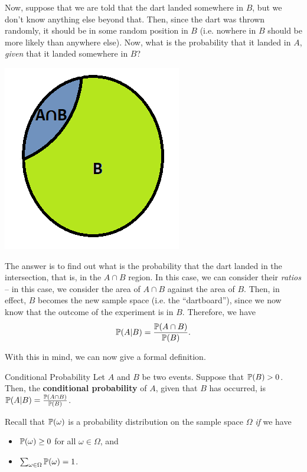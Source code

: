 \documentclass[letterpaper]{article}
\begin{document}
\begin{mdframed}[]
    Now, suppose that we are told that the dart landed somewhere in $B$, but we don't know anything else beyond that. Then, since the dart was thrown randomly, it should be in some random position in $B$ (i.e. nowhere in $B$ should be more likely than anywhere else). Now, what is the probability that it landed in $A$, \emph{given} that it landed somewhere in $B$?
    \begin{center}
        \includegraphics[scale=0.7]{../assets/venn2.png}
    \end{center}
    The answer is to find out what is the probability that the dart landed in the intersection, that is, in the $A \cap B$ region. In this case, we can consider their \emph{ratios} -- in this case, we consider the area of $A \cap B$ against the area of $B$. Then, in effect, $B$ becomes the new sample space (i.e. the ``dartboard''), since we now know that the outcome of the experiment is in $B$. Therefore, we have 
    \[\mathbb{P}(A | B) = \frac{\mathbb{P}(A \cap B)}{\mathbb{P}(B)}.\]
\end{mdframed}
With this in mind, we can now give a formal definition.
\begin{definition}{Conditional Probability}{}
    Let $A$ and $B$ be two events. Suppose that $\mathbb{P}(B) > 0$. Then, the \textbf{conditional probability} of $A$, given that $B$ has occurred, is $\mathbb{P}(A | B) = \frac{\mathbb{P}(A \cap B)}{\mathbb{P}(B)}$.  
\end{definition}
Recall that $\mathbb{P}(\omega)$ is a probability distribution on the sample space $\Omega$ \emph{if} we have 
\begin{itemize}
    \item $\mathbb{P}(\omega) \geq 0$ for all $\omega \in \Omega$, and 
    \item $\sum_{\omega \in \Omega} \mathbb{P}(\omega) = 1$. 
\end{itemize}
\end{document}
